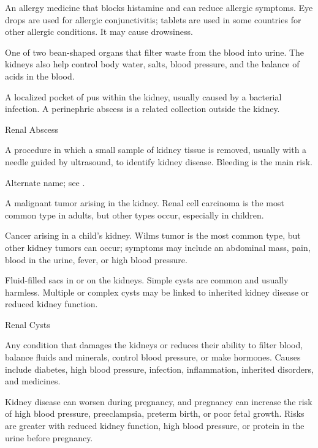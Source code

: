  An allergy medicine that blocks histamine and can reduce allergic symptoms. Eye drops are used for allergic conjunctivitis; tablets are used in some countries for other allergic conditions. It may cause drowsiness.

 One of two bean-shaped organs that filter waste from the blood into urine. The kidneys also help control body water, salts, blood pressure, and the balance of acids in the blood.

 A localized pocket of pus within the kidney, usually caused by a bacterial infection. A perinephric abscess is a related collection outside the kidney.

\synonyms
Renal Abscess

 A procedure in which a small sample of kidney tissue is removed, usually with a needle guided by ultrasound, to identify kidney disease. Bleeding is the main risk.

 Alternate name; see .

 A malignant tumor arising in the kidney. Renal cell carcinoma is the most common type in adults, but other types occur, especially in children.

 Cancer arising in a child’s kidney. Wilms tumor is the most common type, but other kidney tumors can occur; symptoms may include an abdominal mass, pain, blood in the urine, fever, or high blood pressure.

 Fluid-filled sacs in or on the kidneys. Simple cysts are common and usually harmless. Multiple or complex cysts may be linked to inherited kidney disease or reduced kidney function.

\synonyms
Renal Cysts

 Any condition that damages the kidneys or reduces their ability to filter blood, balance fluids and minerals, control blood pressure, or make hormones. Causes include diabetes, high blood pressure, infection, inflammation, inherited disorders, and medicines.

 Kidney disease can worsen during pregnancy, and pregnancy can increase the risk of high blood pressure, preeclampsia, preterm birth, or poor fetal growth. Risks are greater with reduced kidney function, high blood pressure, or protein in the urine before pregnancy.

